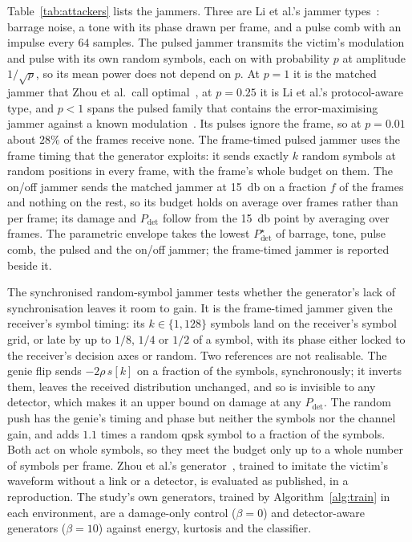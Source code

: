 Table~\ref{tab:attackers} lists the jammers.
Three are Li et al.'s jammer types~\cite{li2022jamming_ofdm}: barrage noise, a tone with its phase drawn per frame, and a pulse comb with an impulse every $64$ samples.
The pulsed jammer transmits the victim's modulation and pulse with its own random symbols, each on with probability $p$ at amplitude $1/\sqrt p$, so its mean power does not depend on $p$.
At $p=1$ it is the matched jammer that Zhou et al.\ call optimal~\cite{11184988}, at $p=0.25$ it is Li et al.'s protocol-aware type, and $p<1$ spans the pulsed family that contains the error-maximising jammer against a known modulation~\cite{amuru2015optimal}.
Its pulses ignore the frame, so at $p=0.01$ about $28\%$ of the frames receive none.
The frame-timed pulsed jammer uses the frame timing that the generator exploits: it sends exactly $k$ random symbols at random positions in every frame, with the frame's whole budget on them.
The on/off jammer sends the matched jammer at \SI{15}{\decibel} on a fraction $f$ of the frames and nothing on the rest, so its budget holds on average over frames rather than per frame; its damage and $P_\text{det}$ follow from the \SI{15}{\decibel} point by averaging over frames.
The parametric envelope takes the lowest $P^{\star}_\text{det}$ of barrage, tone, pulse comb, the pulsed and the on/off jammer; the frame-timed jammer is reported beside it.

The synchronised random-symbol jammer tests whether the generator's lack of synchronisation leaves it room to gain.
It is the frame-timed jammer given the receiver's symbol timing: its $k\in\{1,128\}$ symbols land on the receiver's symbol grid, or late by up to $1/8$, $1/4$ or $1/2$ of a symbol, with its phase either locked to the receiver's decision axes or random.
Two references are not realisable.
The genie flip sends $-2\rho\,s[k]$ on a fraction of the symbols, synchronously; it inverts them, leaves the received distribution unchanged, and so is invisible to any detector, which makes it an upper bound on damage at any $P_\text{det}$.
The random push has the genie's timing and phase but neither the symbols nor the channel gain, and adds $1.1$ times a random \ac{qpsk} symbol to a fraction of the symbols.
Both act on whole symbols, so they meet the budget only up to a whole number of symbols per frame.
Zhou et al.'s generator~\cite{11184988}, trained to imitate the victim's waveform without a link or a detector, is evaluated as published, in a reproduction.
The study's own generators, trained by Algorithm~\ref{alg:train} in each environment, are a damage-only control ($\beta=0$) and detector-aware generators ($\beta=10$) against energy, kurtosis and the classifier.
